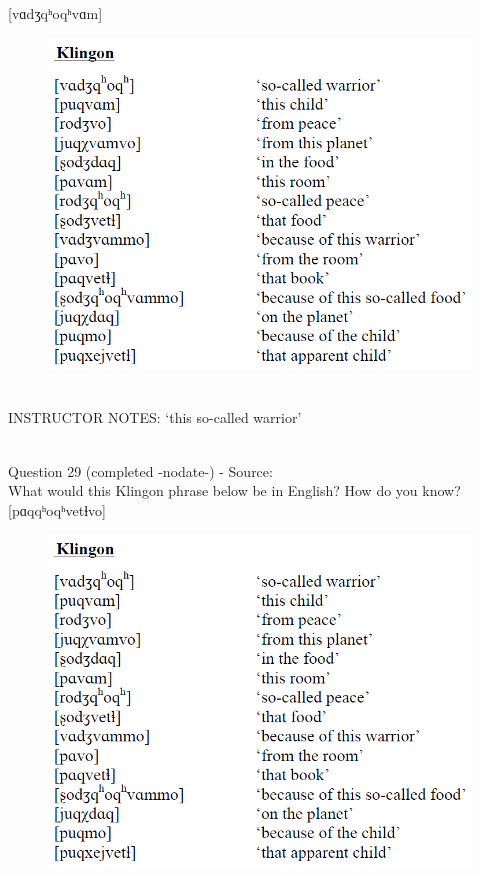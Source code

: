 \documentclass[12pt]{article}
\begin{document}
{[vɑdʒqʰoqʰvɑm]}

\begin{figure}[H]
\includegraphics{../images/klingon.png}
\end{figure}

~\\
INSTRUCTOR NOTES: ‘this so-called warrior’


~\\

{\large Question 29} (completed -nodate-) - Source: \\

What would this Klingon phrase below be in English? How do you know?\\

{[pɑqqʰoqʰvetɬvo]}

\begin{figure}[H]
\includegraphics{../images/klingon.png}
\end{figure}
\end{document}
